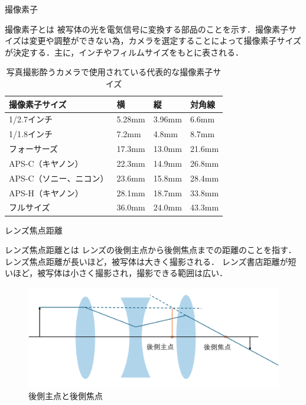 \documentclass[8pt, jfont=ipaexm, t]{beamer} %
\begin{document}
\begin{frame}{撮像素子}
  \begin{block}{撮像素子とは}
    被写体の光を電気信号に変換する部品のことを示す．撮像素子サイズは変更や調整ができない為，カメラを選定することによって撮像素子サイズが決定する．主に，インチやフィルムサイズをもとに表される．
  \end{block}

  \begin{table}[H]
    \centering
    \caption{写真撮影酔うカメラで使用されている代表的な撮像素子サイズ}
    \begin{tabular}{|l|lll|}
      \hline
      撮像素子サイズ & 横 & 縦 & 対角線 \\
      \hline
      1/2.7インチ & 5.28mm & 3.96mm & 6.6mm \\
      1/1.8インチ & 7.2mm & 4.8mm & 8.7mm \\
      フォーサーズ & 17.3mm & 13.0mm & 21.6mm \\
      APS-C（キヤノン） & 22.3mm & 14.9mm & 26.8mm \\
      APS-C（ソニー、ニコン） & 23.6mm & 15.8mm & 28.4mm \\
      APS-H（キヤノン） & 28.1mm & 18.7mm & 33.8mm \\
      フルサイズ & 36.0mm & 24.0mm & 43.3mm \\
      \hline
    \end{tabular}
  \end{table}
\end{frame}


\begin{frame}{レンズ焦点距離}
  \begin{block}{レンズ焦点距離とは}
    レンズの後側主点から後側焦点までの距離のことを指す．
    レンズ焦点距離が長いほど，被写体は大きく撮影される．
    レンズ書店距離が短いほど，被写体は小さく撮影され，撮影できる範囲は広い．
  \end{block}

  \begin{figure}[H]
    \centering
    \includegraphics[scale=0.3]{figure/04.png}
    \caption{後側主点と後側焦点}
    \label{fig:04}
  \end{figure}
\end{frame}
\end{document}
